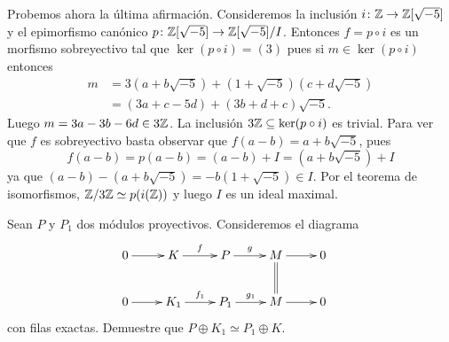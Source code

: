 \begin{example}
	Probemos ahora la última afirmación. Consideremos la inclusión $i\colon
	\mathbb{Z}\to\mathbb{Z}[\sqrt{-5}]$ y el epimorfismo canónico $p\colon
	\mathbb{Z}[\sqrt{-5}]\to\mathbb{Z}[\sqrt{-5}]/I$. Entonces $f=p\circ i$ es un morfismo sobreyectivo 
	tal que $\ker(p\circ i)=(3)$ pues si $m\in\ker(p\circ i)$ entonces 
	\begin{align*}
		m&=3(a+b\sqrt{-5})+(1+\sqrt{-5})(c+d\sqrt{-5})\\
		&=(3a+c-5d)+(3b+d+c)\sqrt{-5}.
	\end{align*}
	Luego $m=3a-3b-6d\in3\mathbb{Z}$. La inclusión $3\mathbb{Z}\subseteq\ker(p\circ i)$ es trivial.
	Para ver que $f$ es sobreyectivo basta observar que $f(a-b)=a+b\sqrt{-5}$, pues
    \[
    f(a-b)=p(a-b)=(a-b)+I=(a+b\sqrt{-5})+I
    \]
    ya que $(a-b)-(a+b\sqrt{-5})=-b(1+\sqrt{-5})\in I$. 
	Por el teorema de isomorfismos, $\mathbb{Z}/3\mathbb{Z}\simeq p(i(\mathbb{Z}))$ y
	luego $I$ es un ideal maximal. 
	\end{example}

\begin{exercise}
\label{xca:proyectivo1}
	Sean $P$ y $P_1$ dos módulos proyectivos. Consideremos el diagrama
	\begin{align*}
		&\xymatrix{
		0\ar[r] 
		& K
		\ar[r]^-{f}
		& P
		\ar[r]^-{g}
		& M\ar[r]\ar@{=}[d]
		& 0\\
		0\ar[r] 
		& K_1
		\ar[r]^-{f_1}
		& P_1
		\ar[r]^-{g_1}
		& M\ar[r]
		& 0
		}
	\end{align*}
	con filas exactas. Demuestre que $P\oplus K_1\simeq P_1\oplus K$.
\end{exercise}

